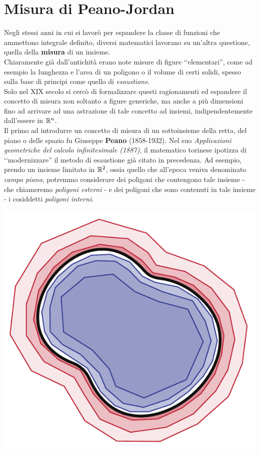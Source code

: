 \section{Misura di Peano-Jordan}
Negli stessi anni in cui si lavorò per espandere la classe di funzioni che ammettono integrale definito, diversi matematici lavorano su un'altra questione, quella della \textbf{misura} di un insieme.\\
Chiaramente già dall'antichità erano note misure di figure ‘‘elementari'', come ad esempio la lunghezza e l'area di un poligono o il volume di certi solidi, spesso sulla base di principi come quello di \textit{esaustione}.\\
Solo nel XIX secolo si cercò di formalizzare questi ragionamenti ed espandere il concetto di misura non soltanto a figure generiche, ma anche a più dimensioni fino ad arrivare ad una astrazione di tale concetto ad insiemi, indipendentemente dall'essere in $\mathbb{R}^n$.\\
Il primo ad introdurre un concetto di misura di un sottoinsieme della retta, del piano o delle spazio fu Giuseppe \textbf{Peano} (1858-1932). Nel suo \textit{Applicazioni geometriche del
calcolo infinitesimale (1887)}, il matematico torinese ipotizza di ‘‘modernizzare'' il metodo di esaustione già citato in precedenza.
Ad esempio, prendo un insieme limitato in $\mathbb{R}^2$, ossia quello che all'epoca veniva denominato \textit{campo piano}, potremmo considerare dei poligoni che contengono tale insieme - che chiameremo \textit{poligoni esterni} - e dei poligoni che sono contenuti in tale insieme - i cosiddetti \textit{poligoni interni}.
\begin{center}
	\includegraphics[trim=0cm 0cm 0cm 0cm, clip, scale=0.71]{images/peanopoligoni.pdf}
\end{center}
